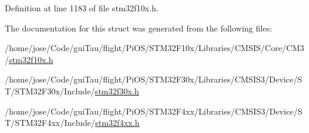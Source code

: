 Definition at line 1183 of file stm32f10x.\-h.



The documentation for this struct was generated from the following files\-:\begin{DoxyCompactItemize}
\item 
/home/jose/\-Code/gui\-Tau/flight/\-Pi\-O\-S/\-S\-T\-M32\-F10x/\-Libraries/\-C\-M\-S\-I\-S/\-Core/\-C\-M3/\hyperlink{stm32f10x_8h}{stm32f10x.\-h}\item 
/home/jose/\-Code/gui\-Tau/flight/\-Pi\-O\-S/\-S\-T\-M32\-F30x/\-Libraries/\-C\-M\-S\-I\-S3/\-Device/\-S\-T/\-S\-T\-M32\-F30x/\-Include/\hyperlink{stm32f30x_8h}{stm32f30x.\-h}\item 
/home/jose/\-Code/gui\-Tau/flight/\-Pi\-O\-S/\-S\-T\-M32\-F4xx/\-Libraries/\-C\-M\-S\-I\-S3/\-Device/\-S\-T/\-S\-T\-M32\-F4xx/\-Include/\hyperlink{stm32f4xx_8h}{stm32f4xx.\-h}\end{DoxyCompactItemize}
